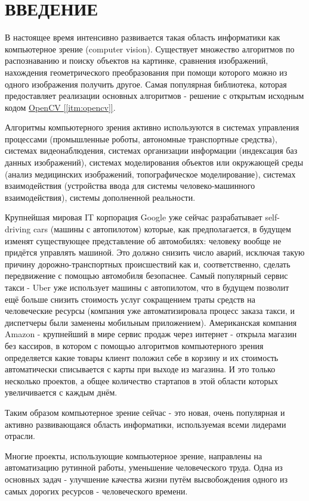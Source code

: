 \chapter*{ВВЕДЕНИЕ}

В настоящее время интенсивно развивается такая область информатики как компьютерное зрение (computer vision). Существует множество алгоритмов по распознаванию и поиску объектов на картинке, сравнения изображений, нахождения геометрического преобразования при помощи которого можно из одного изображения получить другое. Самая популярная библиотека, которая предоставляет реализации основных алгоритмов - решение с открытым исходным кодом \hyperref[itm:opencv]{OpenCV [\ref{itm:opencv}]}.

Алгоритмы компьютерного зрения активно используются в системах управления процессами (промышленные роботы, автономные транспортные средства), системах видеонаблюдения, системах организации информации (индексация баз данных изображений), системах моделирования объектов или окружающей среды (анализ медицинских изображений, топографическое моделирование), системах взаимодействия (устройства ввода для системы человеко-машинного взаимодействия), системы дополненной реальности.

Крупнейшая мировая IT корпорация Google уже сейчас разрабатывает self-driving cars (машины с автопилотом) которые, как предполагается, в будущем изменят существующее представление об автомобилях: человеку вообще не придётся управлять машиной. Это должно снизить число аварий, исключая такую причину дорожно-транспортных происшествий как  и, соответственно, сделать передвижение с помощью автомобиля безопаснее. Самый популярный сервис такси - Uber уже использует машины с автопилотом, что в будущем позволит ещё больше снизить стоимость услуг сокращением траты средств на человеческие ресурсы (компания уже автоматизировала процесс заказа такси, и диспетчеры были заменены мобильным приложением). Американская компания Amazon - крупнейший в мире сервис продаж через интернет - открыла магазин без кассиров, в котором с помощью алгоритмов компьютерного зрения определяется какие товары клиент положил себе в корзину и их стоимость автоматически списывается с карты при выходе из магазина. И это только несколько проектов, а общее количество стартапов в этой области которых увеличивается с каждым днём.

Таким образом компьютерное зрение сейчас - это новая, очень популярная и активно развивающаяся область информатики, используемая всеми лидерами отрасли.

Многие проекты, использующие компьютерное зрение, направлены на автоматизацию рутинной работы, уменьшение человеческого труда. Одна из основных задач - улучшение качества жизни путём высвобождения одного из самых дорогих ресурсов - человеческого времени.

\newpage
